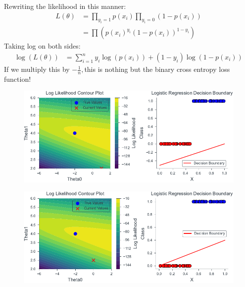 \documentclass{beamer}
\begin{document}
\begin{frame}
Rewriting the likelihood in this manner:
\begin{align*}
    L(\theta)&= \prod_{y_i=1}p(x_i)\prod_{y_i=0}(1-p(x_i))\\
    &=\prod\left(p(x_i)^{y_i}(1-p(x_i))^{1-y_i}\right)
\end{align*}
Taking log on both sides:\\
\begin{align*}
    \log(L(\theta)) &= \sum_{i=1}^n y_i\log(p(x_i)) + (1-y_i)\log(1-p(x_i))
\end{align*}
If we multiply this by $-\frac{1}{n},$this is nothing but the binary cross entropy loss function!
\end{frame}
\begin{frame}
    \begin{figure}
                \centerline{\includegraphics[scale=0.8]{../figures/mle/log_reg_slider_1.pdf}}
\end{figure}
\end{frame}
\begin{frame}
    \begin{figure}
                \centerline{\includegraphics[scale=0.8]{../figures/mle/log_reg_slider_2.pdf}}
\end{figure}
\end{frame}
\end{document}
